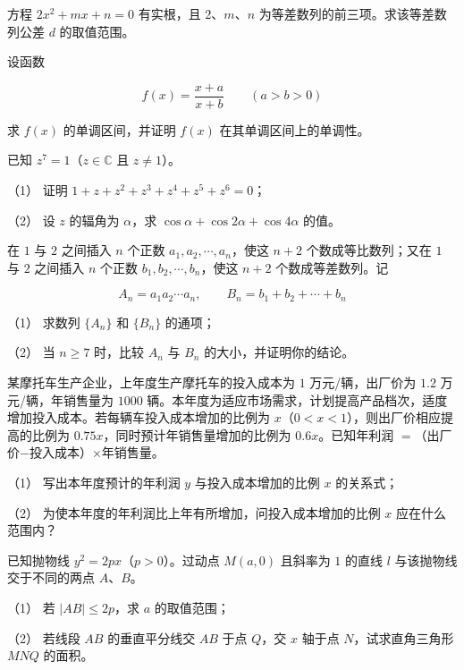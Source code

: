\begin{question}
方程 $2x^2+mx+n=0$ 有实根，且 $2\text{、}m\text{、}n$ 为等差数列的前三项。求该等差数列公差 $d$ 的取值范围。

\end{question}
\begin{question}
设函数

\nopagebreak[4]
\[
f(x)=\frac{x+a}{x+b}\qquad(a>b>0)
\]

求 $f(x)$ 的单调区间，并证明 $f(x)$ 在其单调区间上的单调性。

\end{question}
\begin{question}
已知 $z^7=1$（$z\in\mathbb C$ 且 $z\ne1$）。

（1） 证明 $1+z+z^2+z^3+z^4+z^5+z^6=0$；

（2） 设 $z$ 的辐角为 $\alpha$，求 $\cos\alpha+\cos2\alpha+\cos4\alpha$ 的值。

\end{question}
\begin{question}
在 $1$ 与 $2$ 之间插入 $n$ 个正数 $a_1,a_2,\cdots,a_n$，使这 $n+2$ 个数成等比数列；又在 $1$ 与 $2$ 之间插入 $n$ 个正数 $b_1,b_2,\cdots,b_n$，使这 $n+2$ 个数成等差数列。记

\nopagebreak[4]
\[
A_n=a_1a_2\cdots a_n,\qquad B_n=b_1+b_2+\cdots+b_n
\]

（1） 求数列 $\{A_n\}$ 和 $\{B_n\}$ 的通项；

（2） 当 $n\ge7$ 时，比较 $A_n$ 与 $B_n$ 的大小，并证明你的结论。

\end{question}
\begin{question}
某摩托车生产企业，上年度生产摩托车的投入成本为 $1$ 万元/辆，出厂价为 $1.2$ 万元/辆，年销售量为 $1000$ 辆。本年度为适应市场需求，计划提高产品档次，适度增加投入成本。若每辆车投入成本增加的比例为 $x$（$0<x<1$），则出厂价相应提高的比例为 $0.75x$，同时预计年销售量增加的比例为 $0.6x$。已知年利润 $=$（出厂价$-$投入成本）$\times$年销售量。

（1） 写出本年度预计的年利润 $y$ 与投入成本增加的比例 $x$ 的关系式；

（2） 为使本年度的年利润比上年有所增加，问投入成本增加的比例 $x$ 应在什么范围内？

\end{question}
\begin{question}
已知抛物线 $y^2=2px$（$p>0$）。过动点 $M(a,0)$ 且斜率为 $1$ 的直线 $l$ 与该抛物线交于不同的两点 $A\text{、}B$。

（1） 若 $|AB|\le2p$，求 $a$ 的取值范围；

（2） 若线段 $AB$ 的垂直平分线交 $AB$ 于点 $Q$，交 $x$ 轴于点 $N$，试求直角三角形 $MNQ$ 的面积。

\end{question}